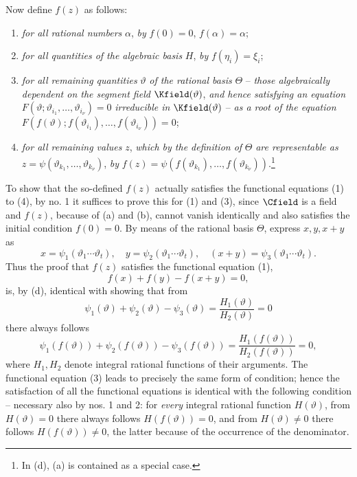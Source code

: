 \documentclass[11pt]{article}
\begin{document}
Now define \(f(z)\) as follows:
\begin{enumerate}
\item[(a)] \emph{for all rational numbers} \(\alpha\), \emph{by} \(f(0)=0\), \(f(\alpha)=\alpha\);
\item[(b)] \emph{for all quantities of the algebraic basis} \(H\), \emph{by} \(f(\eta_i)=\xi_i\);
\item[(c)] \emph{for all remaining quantities} \(\vartheta\) \emph{of the rational basis} \(\Theta\) -- \emph{those algebraically dependent on the segment field} \(\Kfield(\vartheta)\), \emph{and hence satisfying an equation} \(F(\vartheta;\vartheta_{i_1},\ldots,\vartheta_{i_\nu})=0\) \emph{irreducible in} \(\Kfield(\vartheta)\) -- \emph{as a root of the equation} \(F(f(\vartheta);f(\vartheta_{i_1}),\ldots,f(\vartheta_{i_\nu}))=0\);
\item[(d)] \emph{for all remaining values} \(z\), \emph{which by the definition of} \(\Theta\) \emph{are representable as} \(z=\psi(\vartheta_{k_1},\ldots,\vartheta_{k_\nu})\), \emph{by} \(f(z)=\psi(f(\vartheta_{k_1}),\ldots,f(\vartheta_{k_\nu}))\).\footnote{In (d), (a) is contained as a special case.}
\end{enumerate}
To show that the so-defined \(f(z)\) actually satisfies the functional equations (1) to (4), by no. 1 it suffices to prove this for (1) and (3), since \(\Cfield\) is a field and \(f(z)\), because of (a) and (b), cannot vanish identically and also satisfies the initial condition \(f(0)=0\). By means of the rational basis \(\Theta\), express \(x,y,x+y\) as
\[
x=\psi_1(\vartheta_1\cdots\vartheta_t),\quad
 y=\psi_2(\vartheta_1\cdots\vartheta_t),\quad
 (x+y)=\psi_3(\vartheta_1\cdots\vartheta_t).
\]
Thus the proof that \(f(z)\) satisfies the functional equation (1),
\[
f(x)+f(y)-f(x+y)=0,
\]
is, by (d), identical with showing that from
\[
\psi_1(\vartheta)+\psi_2(\vartheta)-\psi_3(\vartheta)
 =\frac{H_1(\vartheta)}{H_2(\vartheta)}=0
\]
there always follows
\[
\psi_1(f(\vartheta))+\psi_2(f(\vartheta))-\psi_3(f(\vartheta))
 =\frac{H_1(f(\vartheta))}{H_2(f(\vartheta))}=0,
\]
where \(H_1,H_2\) denote integral rational functions of their arguments. The functional equation (3) leads to precisely the same form of condition; hence the satisfaction of all the functional equations is identical with the following condition -- necessary also by nos. 1 and 2: for \emph{every} integral rational function \(H(\vartheta)\), from \(H(\vartheta)=0\) there always follows \(H(f(\vartheta))=0\), and from \(H(\vartheta)\ne0\) there follows \(H(f(\vartheta))\ne0\), the latter because of the occurrence of the denominator.
\end{document}
